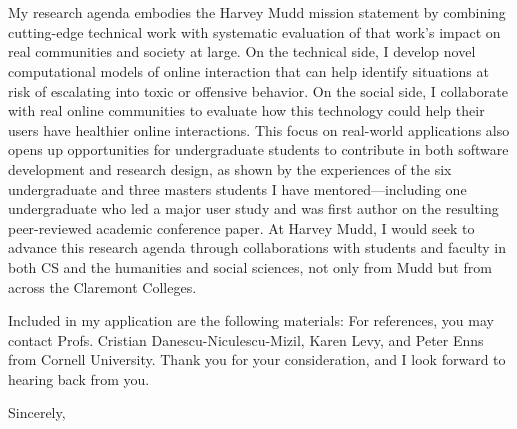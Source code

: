 \documentclass[12pt]{letter}
\begin{document}
\begin{letter}{
\department \\
\schoolnamelong \\
\schooladdress
}
My research agenda embodies the Harvey Mudd mission statement by combining cutting-edge technical work with systematic evaluation of that work's impact on real communities and society at large.
On the technical side, I develop novel computational models of online interaction that can help identify situations at risk of escalating into toxic or offensive behavior.
On the social side, I collaborate with real online communities to evaluate how this technology could help their users have healthier online interactions.
This focus on real-world applications also opens up opportunities for undergraduate students to contribute in both software development and research design, as shown by the experiences of the six undergraduate and three masters students I have mentored---including one undergraduate who led a major user study and was first author on the resulting peer-reviewed academic conference paper.
At Harvey Mudd, I would seek to advance this research agenda through collaborations with students and faculty in both CS and the humanities and social sciences, not only from Mudd but from across the Claremont Colleges.

Included in my application are the following materials: \materials
For references, you may contact Profs. Cristian Danescu-Niculescu-Mizil, Karen Levy, and Peter Enns from Cornell University.
Thank you for your consideration, and I look forward to hearing back from you.

\closing{Sincerely,}

\end{letter}
\end{document}
